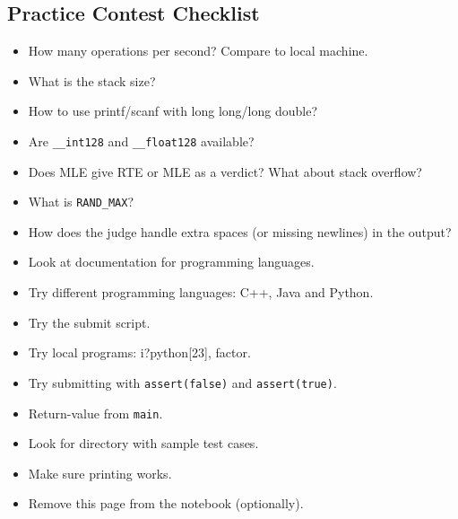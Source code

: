 \documentclass[8pt,a4paper,landscape,oneside]{amsart}
\begin{document}
\begin{multicols*}{3}
    \clearpage
    \section*{Practice Contest Checklist}
        \begin{itemize}
            \item How many operations per second? Compare to local machine.
            \item What is the stack size?
            \item How to use printf/scanf with long long/long double?
            \item Are \texttt{\_{}\_{}int128} and \texttt{\_{}\_{}float128} available?
            \item Does MLE give RTE or MLE as a verdict? What about stack overflow?
            \item What is \texttt{RAND\_{}MAX}?
            \item How does the judge handle extra spaces (or missing newlines) in the output?
            \item Look at documentation for programming languages.
            \item Try different programming languages: C++, Java and Python.
            \item Try the submit script.
            \item Try local programs: i?python[23], factor.
            \item Try submitting with \texttt{assert(false)} and \texttt{assert(true)}.
            \item Return-value from \texttt{main}.
            \item Look for directory with sample test cases.
            \item Make sure printing works.

            \item Remove this page from the notebook (optionally).
        \end{itemize}
\end{multicols*}
\end{document}
